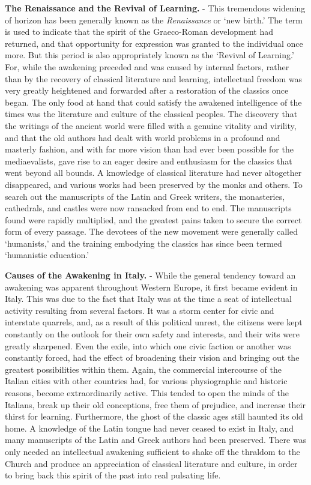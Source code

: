 \documentclass[
]{book}
\begin{document}
\textbf{The Renaissance and the Revival of Learning.} - This tremendous widening of horizon has been generally known as the \emph{Renaissance} or `new birth.' The term is used to indicate that the spirit of the Graeco-Roman development had returned, and that opportunity for expression was granted to the individual once more. But this period is also appropriately known as the `Revival of Learning.' For, while the awakening preceded and was caused by internal factors, rather than by the recovery of classical literature and learning, intellectual freedom was very greatly heightened and forwarded after a restoration of the classics once began. The only food at hand that could satisfy the awakened intelligence of the times was the literature and culture of the classical peoples. The discovery that the writings of the ancient world were filled with a genuine vitality and virility, and that the old authors had dealt with world problems in a profound and masterly fashion, and with far more vision than had ever been possible for the mediaevalists, gave rise to an eager desire and enthusiasm for the classics that went beyond all bounds. A knowledge of classical literature had never altogether disappeared, and various works had been preserved by the monks and others. To search out the manuscripts of the Latin and Greek writers, the monasteries, cathedrals, and castles were now ransacked from end to end. The manuscripts found were rapidly multiplied, and the greatest pains taken to secure the correct form of every passage. The devotees of the new movement were generally called `humanists,' and the training embodying the classics has since been termed `humanistic education.'

\textbf{Causes of the Awakening in Italy.} - While the general tendency toward an awakening was apparent throughout Western Europe, it first became evident in Italy. This was due to the fact that Italy was at the time a seat of intellectual activity resulting from several factors. It was a storm center for civic and interstate quarrels, and, as a result of this political unrest, the citizens were kept constantly on the outlook for their own safety and interests, and their wits were greatly sharpened. Even the exile, into which one civic faction or another was constantly forced, had the effect of broadening their vision and bringing out the greatest possibilities within them. Again, the commercial intercourse of the Italian cities with other countries had, for various physiographic and historic reasons, become extraordinarily active. This tended to open the minds of the Italians, break up their old conceptions, free them of prejudice, and increase their thirst for learning. Furthermore, the ghost of the classic ages still haunted its old home. A knowledge of the Latin tongue had never ceased to exist in Italy, and many manuscripts of the Latin and Greek authors had been preserved. There was only needed an intellectual awakening sufficient to shake off the thraldom to the Church and produce an appreciation of classical literature and culture, in order to bring back this spirit of the past into real pulsating life.
\end{document}
